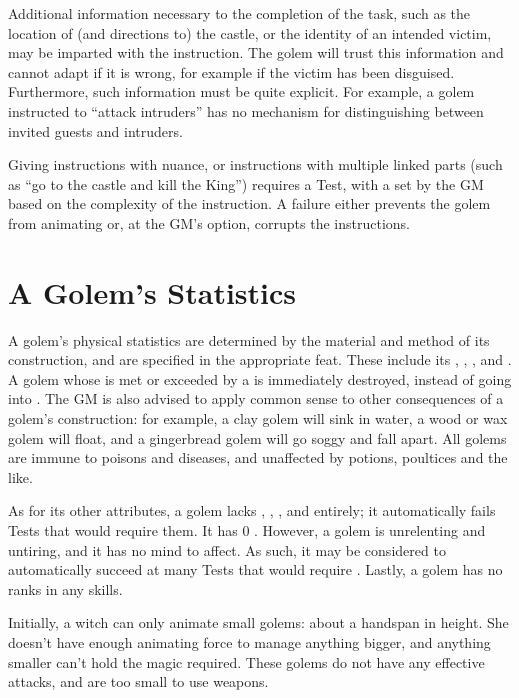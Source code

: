 Additional information necessary to the completion of the task, such as the location of (and directions to) the castle, or the identity of an intended victim, may be imparted with the instruction.
The golem will trust this information and cannot adapt if it is wrong, for example if the victim has been disguised.
Furthermore, such information must be quite explicit.
For example, a golem instructed to ``attack intruders'' has no mechanism for distinguishing between invited guests and intruders.

Giving instructions with nuance, or instructions with multiple linked parts (such as ``go to the castle and kill the King'') requires a Test, with a {\tn} set by the GM based on the complexity of the instruction.
A failure either prevents the golem from animating or, at the GM's option, corrupts the instructions.

\section{A Golem's Statistics}

A golem's physical statistics are determined by the material and method of its construction, and are specified in the appropriate feat.
These include its , , ,  and .
A golem whose  is met or exceeded by a {\damagetest} is immediately destroyed, instead of going into {\shock}.
The GM is also advised to apply common sense to other consequences of a golem's construction: for example, a clay golem will sink in water, a wood or wax golem will float, and a gingerbread golem will go soggy and fall apart.
All golems are immune to poisons and diseases, and unaffected by potions, poultices and the like.

As for its other attributes, a golem lacks , , ,  and  entirely; it automatically fails Tests that would require them.
It has 0 .
However, a golem is unrelenting and untiring, and it has no mind to affect.
As such, it may be considered to automatically succeed at many Tests that would require .
Lastly, a golem has no ranks in any skills.

Initially, a witch can only animate small golems: about a handspan in height.
She doesn't have enough animating force to manage anything bigger, and anything smaller can't hold the magic required.
These golems do not have any effective attacks, and are too small to use weapons.

